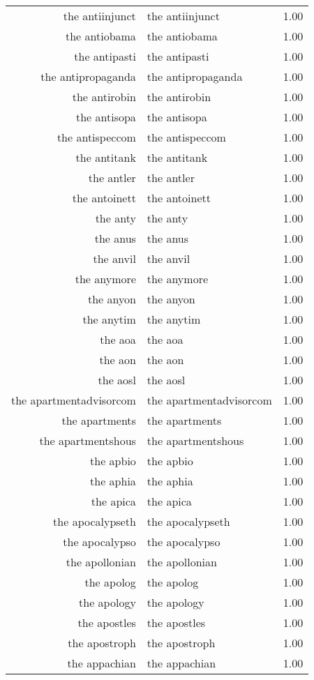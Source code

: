 \begin{table}[ht]
\begin{tabular}{rlr}
  the antiinjunct & the antiinjunct & 1.00 \\ 
  the antiobama & the antiobama & 1.00 \\ 
  the antipasti & the antipasti & 1.00 \\ 
  the antipropaganda & the antipropaganda & 1.00 \\ 
  the antirobin & the antirobin & 1.00 \\ 
  the antisopa & the antisopa & 1.00 \\ 
  the antispeccom & the antispeccom & 1.00 \\ 
  the antitank & the antitank & 1.00 \\ 
  the antler & the antler & 1.00 \\ 
  the antoinett & the antoinett & 1.00 \\ 
  the anty & the anty & 1.00 \\ 
  the anus & the anus & 1.00 \\ 
  the anvil & the anvil & 1.00 \\ 
  the anymore & the anymore & 1.00 \\ 
  the anyon & the anyon & 1.00 \\ 
  the anytim & the anytim & 1.00 \\ 
  the aoa & the aoa & 1.00 \\ 
  the aon & the aon & 1.00 \\ 
  the aosl & the aosl & 1.00 \\ 
  the apartmentadvisorcom & the apartmentadvisorcom & 1.00 \\ 
  the apartments & the apartments & 1.00 \\ 
  the apartmentshous & the apartmentshous & 1.00 \\ 
  the apbio & the apbio & 1.00 \\ 
  the aphia & the aphia & 1.00 \\ 
  the apica & the apica & 1.00 \\ 
  the apocalypseth & the apocalypseth & 1.00 \\ 
  the apocalypso & the apocalypso & 1.00 \\ 
  the apollonian & the apollonian & 1.00 \\ 
  the apolog & the apolog & 1.00 \\ 
  the apology & the apology & 1.00 \\ 
  the apostles & the apostles & 1.00 \\ 
  the apostroph & the apostroph & 1.00 \\ 
  the appachian & the appachian & 1.00 \\ 

\end{tabular}
\end{table}
